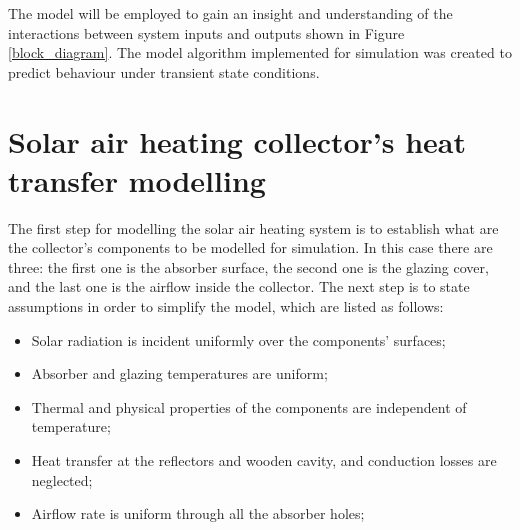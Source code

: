

The model will be employed to gain an insight and understanding of the interactions between system inputs and outputs shown in Figure \ref{block_diagram}. The model algorithm implemented for simulation was created to predict behaviour under transient state conditions. 




\section{Solar air heating collector's heat transfer modelling}

The first step for modelling the solar air heating system is to establish what are the collector's components to be modelled for simulation. In this case there are three: the first one is the absorber surface, the second one is the glazing cover, and the last one is the airflow inside the collector. The next step is to state assumptions in order to simplify the model, which are listed as follows:

\begin{itemize}
	\item Solar radiation is incident uniformly over the components' surfaces;
	\item Absorber and glazing temperatures are uniform;
	\item Thermal and physical properties of the components are independent of temperature;
	\item Heat transfer at the reflectors and wooden cavity, and conduction losses are neglected;
	\item Airflow rate is uniform through all the absorber holes;
\end{itemize}

